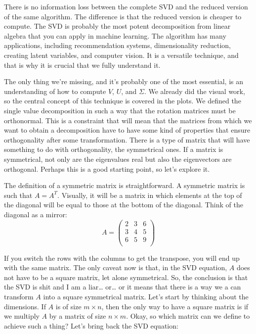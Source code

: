 \documentclass[a4,12pt,twosided,openany]{memoir}
\begin{document}
\par 
\indent
There is no information loss between the complete SVD and the reduced version of the same algorithm. The difference is that the reduced version is cheaper to compute. The SVD is probably the most potent decomposition from linear algebra that you can apply in machine learning. The algorithm has many applications, including recommendation systems, dimensionality reduction, creating latent variables, and computer vision. It is a versatile technique, and that is why it is crucial that we fully understand it.
\par 
\indent
The only thing we’re missing, and it’s probably one of the most essential, is an understanding of how to compute $V$, $U$, and $\Sigma$. We already did the visual work, so the central concept of this technique is covered in the plots. We defined the single value decomposition in such a way that the rotation matrices must be orthonormal. This is a constraint that will mean that the matrices from which we want to obtain a decomposition have to have some kind of properties that ensure orthogonality after some transformation. There is a type of matrix that will have something to do with orthogonality, the symmetrical ones. If a matrix is symmetrical, not only are the eigenvalues real but also the eigenvectors are orthogonal. Perhaps this is a good starting point, so let’s explore it. 
\par 
\indent
The definition of a symmetric matrix is straightforward. A symmetric matrix is such that $A=A^T$. Visually, it will be a matrix in which elements at the top of the diagonal will be equal to those at the bottom of the diagonal. Think of the diagonal as a mirror:
\[A = \begin{pmatrix}
2&3&6 \\
3&4&5 \\
6&5&9 \\
\end{pmatrix}
\]
\par 
\indent
If you switch the rows with the columns to get the transpose, you will end up with the same matrix. The only caveat now is that, in the SVD equation, $A$ does not have to be a square matrix, let alone symmetrical. So, the conclusion is that the SVD is shit and I am a liar… or… or it means that there is a way we a can transform $A$ into a square symmetrical matrix. Let’s start by thinking about the dimensions. If $A$ is of size $m \times n$, then the only way to have a square matrix is if we multiply $A$ by a matrix of size $n \times m$. Okay, so which matrix can we define to achieve such a thing? Let’s bring back the SVD equation:
\end{document}
